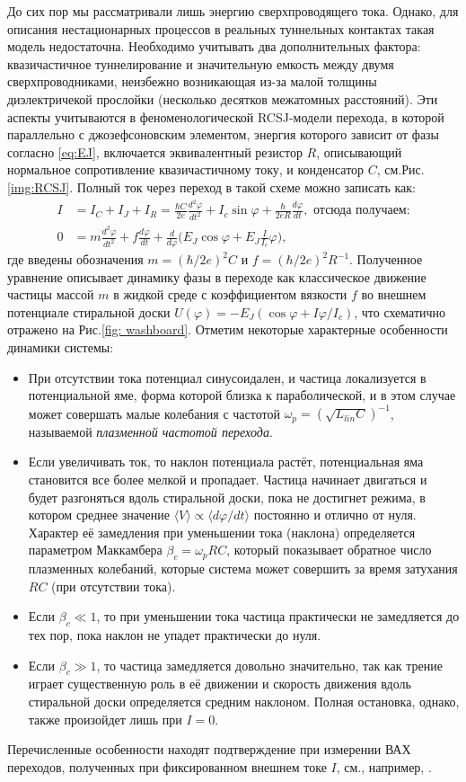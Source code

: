 До сих пор мы рассматривали лишь энергию сверхпроводящего тока. Однако, для описания нестационарных процессов в реальных туннельных контактах такая модель недостаточна. Необходимо учитывать два дополнительных фактора: квазичастичное туннелирование и значительную емкость между двумя сверхпроводниками, неизбежно возникающая из-за малой толщины диэлектричекой прослойки (несколько десятков межатомных расстояний). Эти аспекты учитываются в феноменологической RCSJ-модели перехода, в которой параллельно с джозефсоновским элементом, энергия которого зависит от фазы согласно \eqref{eq:EJ}, включается эквивалентный резистор $R$, описывающий нормальное сопротивление квазичастичному току, и конденсатор $C$, см.\:Рис.\:\ref{img:RCSJ}. Полный ток через переход в такой схеме можно записать как:
\begin{align}
I &= I_C + I_J + I_R = \frac{\hbar C}{2e} \frac{d^2\varphi}{dt^2}+I_c\sin \varphi+ \frac{\hbar}{2eR}\frac{d\varphi}{dt}, \text{ отсюда получаем:}  \nonumber \\
0 & = m\frac{d^2\varphi}{dt^2} + f \frac{d\varphi}{dt} + \frac{d}{d\varphi}\big(E_J\cos \varphi+E_J\frac{ I}{I_c}\varphi\big), 
\end{align}
где введены обозначения $m=(\hbar/2e)^2 C$ и $f=(\hbar/2e)^2R^{-1}$. Полученное уравнение описывает динамику фазы в переходе как классическое движение частицы массой $m$ в жидкой среде с коэффициентом вязкости $f$ во внешнем потенциале стиральной доски $U(\varphi)=-E_J(\cos \varphi+I\varphi/I_c)$, что схематично отражено на Рис.\:\ref{fig: washboard}. Отметим некоторые характерные особенности динамики системы:
\begin{itemize}
	\item При отсутствии тока потенциал синусоидален, и частица локализуется в потенциальной яме, форма которой близка к параболической, и в этом случае может совершать малые колебания с частотой $\omega_p = (\sqrt{L_{lin}C})^{-1}$, называемой \textit{плазменной частотой перехода}. 
	\item Если увеличивать ток, то наклон потенциала растёт, потенциальная яма становится все более мелкой и пропадает. Частица начинает двигаться и будет разгоняться вдоль стиральной доски, пока не достигнет режима, в котором среднее значение $\langle V \rangle  \propto \langle d\varphi/dt \rangle$ постоянно и отлично от нуля. Характер её замедления при уменьшении тока (наклона) определяется параметром Маккамбера $\beta_c = \omega_p R C$, который показывает обратное число плазменных колебаний, которые система может совершить за время затухания $RC$ (при отсутствии тока).
	\item Если $\beta_c\ll1$, то при уменьшении тока частица практически не замедляется до тех пор, пока наклон не упадет практически до нуля. 
	\item Если $\beta_c\gg1$, то частица замедляется довольно значительно, так как трение играет существенную роль в её движении и скорость движения вдоль стиральной доски определяется средним наклоном. Полная остановка, однако, также произойдет лишь при $I=0$.
\end{itemize}
Перечисленные особенности находят подтверждение при измерении ВАХ переходов, полученных при фиксированном внешнем токе $I$, см., например, \cite{Schmidt}. 

